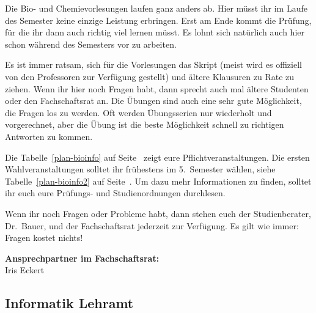 Die Bio- und Chemievorlesungen laufen ganz anders ab.
Hier müsst ihr im Laufe des Semester keine einzige Leistung erbringen.
Erst am Ende kommt die Prüfung, für die ihr dann auch richtig viel lernen müsst.
Es lohnt sich natürlich auch hier schon während des Semesters vor zu arbeiten.

Es ist immer ratsam, sich für die Vorlesungen das Skript (meist wird es offiziell von den Professoren zur Verfügung gestellt) und ältere Klausuren zu Rate zu ziehen.
Wenn ihr hier noch Fragen habt, dann sprecht auch mal ältere Studenten oder den Fachschaftsrat an.
Die Übungen sind auch eine sehr gute Möglichkeit, die Fragen los zu werden.
Oft werden Übungsserien nur wiederholt und vorgerechnet, aber die Übung ist die beste Möglichkeit schnell zu richtigen Antworten zu kommen.

Die Tabelle~\ref{plan-bioinfo} auf Seite~\pageref{plan-bioinfo} zeigt eure Pflichtveranstaltungen.
Die ersten Wahlveranstaltungen solltet ihr frühestens im 5.~Semester wählen, siehe Tabelle~\ref{plan-bioinfo2} auf Seite~\pageref{plan-bioinfo2}.
Um dazu mehr Informationen zu finden, solltet ihr euch eure Prüfungs- und Studienordnungen durchlesen.

Wenn ihr noch Fragen oder Probleme habt, dann stehen euch der Studienberater, Dr.~Bauer, und der Fachschaftsrat jederzeit zur Verfügung.
Es gilt wie immer: Fragen kostet nichts!

\textbf{Ansprechpartner im Fachschaftsrat:}\\
Iris Eckert\\



\subsection{Informatik Lehramt}
\label{studiengang_infolehramt}


